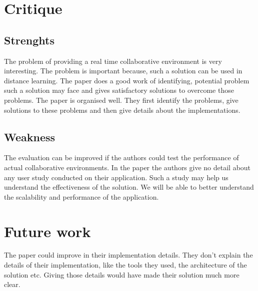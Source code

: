 \documentclass[12pt, onecolumn]{IEEEtran}
\begin{document}
\section{Critique}
\subsection{Strenghts}
The problem of providing a real time collaborative environment is very
interesting. The problem is important because, such a solution can be used in
distance learning. The paper does a good work of identifying, potential problem
such a solution may face and gives satisfactory solutions to overcome those
problems. The paper is organised well. They first identify the problems, give
solutions to these problems and then give details about the implementations.
\\
\subsection{Weakness}
The evaluation can be improved if the authors could test the performance of
actual collaborative environments. In the paper the authors give no detail
about any user study conducted on their application. Such a study may help us
understand the effectiveness of the solution. We will be able to better
understand the scalability and performance of the application.
\\
\section{Future work}
The paper could improve in their implementation details. They don't explain
the details of their implementation, like the tools they used, the architecture
of the solution etc. Giving those details would have made their solution much
more clear.
\\


 
\end{document}
